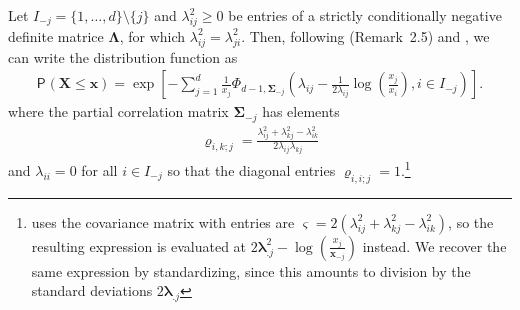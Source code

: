 \documentclass{article}
\newcommand{\bs}[1]{\boldsymbol {#1}}
\renewcommand{\P}[2][]{{\mathsf P}_{#1}\left(#2\right)}
\newcommand{\pfrac}[2]{\left(\frac{#1}{#2}\right)}
\begin{document}
\begin{enumerate}
Let $I_{-j}=\{1, \ldots, d\} \setminus \{j\}$ and $\lambda_{ij}^2 \geq 0$ be entries of a strictly conditionally 
negative definite matrice $\bs{\Lambda}$, for which $\lambda_{ij}^2=\lambda_{ji}^2$. Then, following \cite{Nikoloulopoulos:2009} 
(Remark~2.5) and \cite{Huser:2013}, we can write the distribution function as
 \begin{align*}
   \P{\bs{X} \leq \bs{x}} = \exp \left[ -\sum_{j=1}^d \frac{1}{x_j} \Phi_{d-1, \bs{\Sigma}_{-j}} \left( \lambda_{ij}- 
\frac{1}{2\lambda_{ij}}  \log\pfrac{x_j}{x_i}, i \in I_{-j}\right)\right].                                                        
                  \end{align*}
                  where the partial correlation matrix $\bs{\Sigma}_{-j}$ has elements
                  \begin{align*}
                     \varrho_{i,k; j}= \frac{\lambda_{ij}^2+\lambda_{kj}^2-\lambda_{ik}^2}{2\lambda_{ij}\lambda_{kj}}
                  \end{align*}
and $\lambda_{ii}=0$ for all $i \in I_{-j}$ so that the diagonal entries $\varrho_{i,i; j}=1$.\footnote{\cite{Engelke:2015} 
uses the covariance matrix with entries are $\varsigma=2(\lambda_{ij}^2+\lambda_{kj}^2-\lambda_{ik}^2)$, so the resulting 
expression is evaluated at $2\bs{\lambda}_{.j}^2-\log\pfrac{x_j}{\bs{x}_{-j}}$ instead. We recover the same expression by 
standardizing, since this amounts to division by the standard deviations $2\bs{\lambda}_{.j}$}




\end{enumerate}
\end{document}

